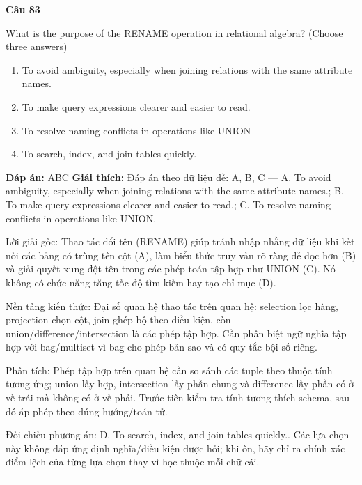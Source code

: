\documentclass[11pt,a4paper]{article}
\newenvironment{question}[1]{%
  \par\vspace{1em}\noindent\textbf{\large Câu #1}\par\vspace{0.4em}
}{%
  \par\vspace{1em}\hrule\vspace{0.6em}
}
\newenvironment{choices}{%
  \begin{enumerate}[label=\textbf{\Alph*.},leftmargin=2.2em,itemsep=2pt,topsep=3pt]
}{%
  \end{enumerate}
}
\newcommand{\choice}{\item}
\begin{document}
\begin{question}{83}
What is the purpose of the RENAME operation in relational algebra? (Choose three answers)
\begin{choices}
\choice To avoid ambiguity, especially when joining relations with the same attribute names.
\choice To make query expressions clearer and easier to read.
\choice To resolve naming conflicts in operations like UNION
\choice To search, index, and join tables quickly.
\end{choices}
\textbf{Đáp án:} ABC
\textbf{Giải thích:} Đáp án theo dữ liệu đề: A, B, C — A. To avoid ambiguity, especially when joining relations with the same attribute names.; B. To make query expressions clearer and easier to read.; C. To resolve naming conflicts in operations like UNION.

Lời giải gốc: Thao tác đổi tên (RENAME) giúp tránh nhập nhằng dữ liệu khi kết nối các bảng có trùng tên cột (A), làm biểu thức truy vấn rõ ràng dễ đọc hơn (B) và giải quyết xung đột tên trong các phép toán tập hợp như UNION (C). Nó không có chức năng tăng tốc độ tìm kiếm hay tạo chỉ mục (D).

Nền tảng kiến thức: Đại số quan hệ thao tác trên quan hệ: selection lọc hàng, projection chọn cột, join ghép bộ theo điều kiện, còn union/difference/intersection là các phép tập hợp. Cần phân biệt ngữ nghĩa tập hợp với bag/multiset vì bag cho phép bản sao và có quy tắc bội số riêng.

Phân tích: Phép tập hợp trên quan hệ cần so sánh các tuple theo thuộc tính tương ứng; union lấy hợp, intersection lấy phần chung và difference lấy phần có ở vế trái mà không có ở vế phải. Trước tiên kiểm tra tính tương thích schema, sau đó áp phép theo đúng hướng/toán tử.

Đối chiếu phương án: D. To search, index, and join tables quickly.. Các lựa chọn này không đáp ứng định nghĩa/điều kiện được hỏi; khi ôn, hãy chỉ ra chính xác điểm lệch của từng lựa chọn thay vì học thuộc mỗi chữ cái.
\end{question}
\end{document}

